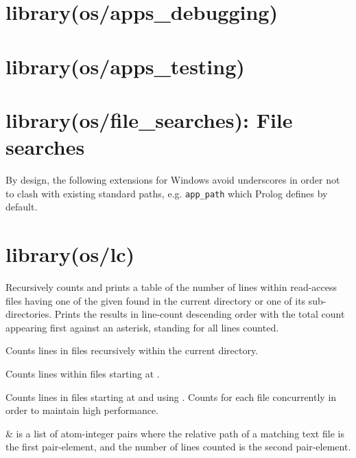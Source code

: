\chapter{library(os/apps_debugging)}\label{sec:appsdebugging}\chapter{library(os/apps_testing)}\label{sec:appstesting}\chapter{library(os/file_searches): File searches}\label{sec:filesearches}

By design, the following extensions for Windows avoid underscores
in order not to clash with existing standard paths, e.g. \verb$app_path$
which Prolog defines by default.\vspace{0.7cm}\chapter{library(os/lc)}\label{sec:lc}

\begin{description}
Recursively counts and prints a table of the number of lines within
read-access files having one of the given  found in the
current directory or one of its sub-directories. Prints the results
in line-count descending order with the total count appearing first
against an asterisk, standing for all lines counted.

Counts lines in files recursively within the current directory.

Counts lines within files starting at .

Counts lines in files starting at  and using .
Counts for each file concurrently in order to maintain high
performance.

\begin{arguments}
 & is a list of atom-integer pairs where the relative path
of a matching text file is the first pair-element, and the number of
lines counted is the second pair-element. \\
\end{arguments}
\end{description}

